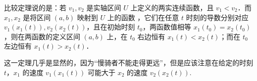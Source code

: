
比较定理说的是：若 $v_1,v_2$ 是实轴区间 $U$ 上定义的两实连续函数，且 $v_1<v_2$．而 $x_1,x_2$ 是将区间 $(a,b)$ 映射到 $U$ 上的函数 ，它们在任意 $t$ 时刻的导数分别对应 $v_1(x_1(t)),v_2(x_2(t))$，且在初始时刻 $t_0$，两函数值相等 $x_1(t_0)=x_2(t_0)$，则在两函数的定义区间 $(a,b)$ 上，在 $t_0$ 右边恒有 $x_1(t)<x_2(t)$；而在 $t_0$ 左边恒有 $x_1(t)>x_2(t)$．

这一定理几乎是显然的，因为“慢骑者不能走得更远”，但是应该注意在给定的时刻 $t$，$x_1$ 的速度 $v_1(x_1(t))$ 可能大于 $x_2$ 的速度 $v_2(x_2(t))$. 
